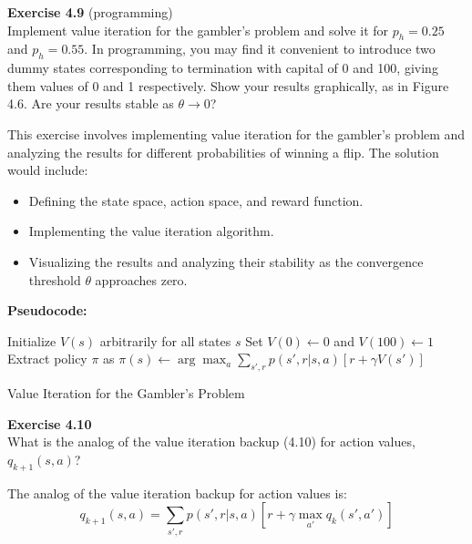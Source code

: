\documentclass[addpoints]{exam}
\begin{document}
\begin{questions}
    \question
    \textbf{Exercise 4.9} (programming) \\ Implement value iteration for the gambler's problem and solve it for \(p_{h}=0.25\) and \(p_{h}=0.55\). In programming, you may find it convenient to introduce two dummy states corresponding to termination with capital of 0 and 100, giving them values of 0 and 1 respectively. Show your results graphically, as in Figure 4.6. Are your results stable as \(\theta\to 0\)?
    \begin{solution}
        This exercise involves implementing value iteration for the gambler's problem and analyzing the results for different probabilities of winning a flip. The solution would include:
        \begin{itemize}
            \item Defining the state space, action space, and reward function.
            \item Implementing the value iteration algorithm.
            \item Visualizing the results and analyzing their stability as the convergence threshold \(\theta\) approaches zero.
        \end{itemize}

        \textbf{Pseudocode:}

\begin{algorithm}[H]
    Initialize \( V(s) \) arbitrarily for all states \( s \)\;
    Set \( V(0) \gets 0 \) and \( V(100) \gets 1 \)\;
    Extract policy \( \pi \) as \( \pi(s) \gets \arg\max_{a} \sum_{s', r} p(s', r | s, a) \left[ r + \gamma V(s') \right] \)\;
    \caption{Value Iteration for the Gambler's Problem}
\end{algorithm}
    \end{solution}

    \question
    \textbf{Exercise 4.10} \\ What is the analog of the value iteration backup (4.10) for action values, \(q_{k+1}(s,a)\)?
    \begin{solution}
        The analog of the value iteration backup for action values is:
        \[
        q_{k+1}(s, a) = \sum_{s', r} p(s', r | s, a) \left[ r + \gamma \max_{a'} q_{k}(s', a') \right]
        \]
    \end{solution}
\end{questions}
\end{document}
